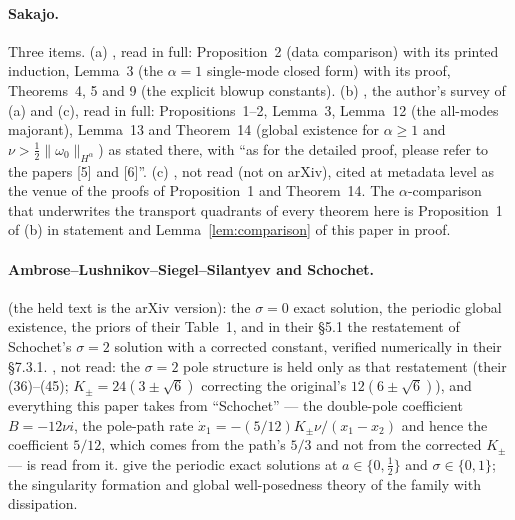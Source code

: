 \documentclass[11pt,a4paper]{article}
\theoremstyle{plain}
\theoremstyle{definition}
\newcommand{\nrm}[1]{\lVert #1 \rVert}
\begin{document}
\paragraph{Sakajo.} Three items. (a) \cite{Sak03b}, read in full: Proposition~2 (data comparison) with its printed induction, Lemma~3 (the $\alpha=1$ single-mode closed form) with its proof, Theorems~4, 5 and 9 (the explicit blowup constants). (b) \cite{Sak03c}, the author's survey of (a) and (c), read in full: Propositions~1--2, Lemma~3, Lemma~12 (the all-modes majorant), Lemma~13 and Theorem~14 (global existence for $\alpha\ge1$ and $\nu>\tfrac12\nrm{\omega_0}_{H^\alpha}$) as stated there, with ``as for the detailed proof, please refer to the papers [5] and [6]''. (c) \cite{Sak03a}, not read (not on arXiv), cited at metadata level as the venue of the proofs of Proposition~1 and Theorem~14. The $\alpha$-comparison that underwrites the transport quadrants of every theorem here is Proposition~1 of (b) in statement and Lemma~\ref{lem:comparison} of this paper in proof.

\paragraph{Ambrose--Lushnikov--Siegel--Silantyev and Schochet.} \cite{ALSS24} (the held text is the arXiv version): the $\sigma=0$ exact solution, the periodic global existence, the priors of their Table~1, and in their \S5.1 the restatement of Schochet's $\sigma=2$ solution with a corrected constant, verified numerically in their \S7.3.1. \cite{Sch86}, not read: the $\sigma=2$ pole structure is held only as that restatement (their (36)--(45); $K_\pm=24(3\pm\sqrt6)$ correcting the original's $12(6\pm\sqrt6)$), and everything this paper takes from ``Schochet'' --- the double-pole coefficient $B=-12\nu i$, the pole-path rate $\dot x_1=-(5/12)K_\pm\nu/(x_1-x_2)$ and hence the coefficient $5/12$, which comes from the path's $5/3$ and not from the corrected $K_\pm$ --- is read from it. \cite{SLSA25} give the periodic exact solutions at $a\in\{0,\tfrac12\}$ and $\sigma\in\{0,1\}$; \cite{Chen20} the singularity formation and global well-posedness theory of the family with dissipation.
\end{document}
